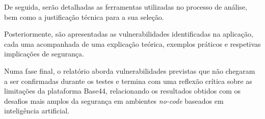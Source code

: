 De seguida, serão detalhadas as ferramentas utilizadas no processo de análise, bem como a justificação técnica para a sua seleção.

Posteriormente, são apresentadas as vulnerabilidades identificadas na aplicação, cada uma acompanhada de uma explicação teórica, exemplos práticos e respetivas implicações de segurança.

Numa fase final, o relatório aborda vulnerabilidades previstas que não chegaram a ser confirmadas durante os testes e termina com uma reflexão crítica sobre as limitações da plataforma Base44, relacionando os resultados obtidos com os desafios mais amplos da segurança em ambientes \textit{no-code} baseados em inteligência artificial.
